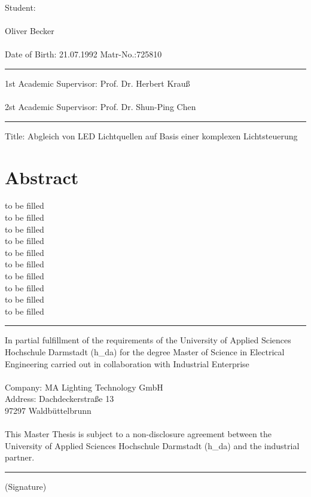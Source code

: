 \documentclass[11pt]{scrartcl}
\begin{document}
\noindent
Student:\\
\\
Oliver \hspace{6cm} Becker\\
\\
Date of Birth: 21.07.1992 \hspace{2.8cm} Matr-No.:725810
\par\noindent\rule{\textwidth}{0.4pt}
1st Academic Supervisor: Prof. Dr. Herbert Krauß\\
\\
2st Academic Supervisor: Prof. Dr. Shun-Ping Chen
\par\noindent\rule{\textwidth}{0.4pt}
Title: Abgleich von LED Lichtquellen auf Basis einer komplexen Lichtsteuerung\\
\par\vspace{-0.8cm}\section*{Abstract}
to be filled\\
to be filled\\
to be filled\\
to be filled\\
to be filled\\
to be filled\\
to be filled\\
to be filled\\
to be filled\\
to be filled\\
\par\noindent\rule{\textwidth}{0.4pt}
In partial fulfillment of the requirements of the University of Applied Sciences Hochschule
Darmstadt (h\_da) for the degree Master of Science in Electrical Engineering carried out in
collaboration with Industrial Enterprise\\
\\
Company:\hspace{0.45cm} MA Lighting Technology GmbH\\
Address:\hspace{0.7cm} Dachdeckerstraße 13\\
\hspace*{2.15cm} 97297 Waldbüttelbrunn\\
\\
This Master Thesis is subject to a non-disclosure agreement between the University of Applied 
Sciences Hochschule Darmstadt (h\_da) and the industrial partner.\\
\par\noindent\rule{\textwidth}{0.4pt}
(Signature)\\
\end{document}
